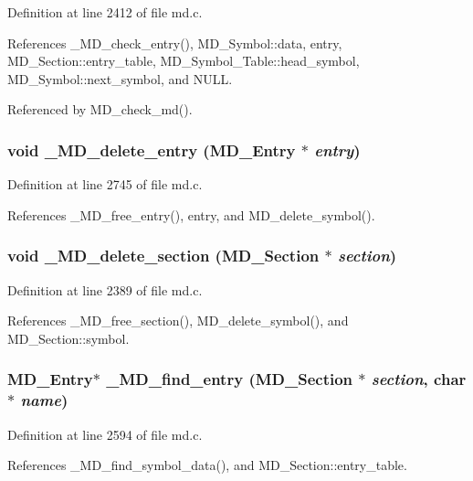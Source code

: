 Definition at line 2412 of file md.c.

References \_\-MD\_\-check\_\-entry(), MD\_\-Symbol::data, entry, MD\_\-Section::entry\_\-table, MD\_\-Symbol\_\-Table::head\_\-symbol, MD\_\-Symbol::next\_\-symbol, and NULL.

Referenced by MD\_\-check\_\-md().
\subsubsection{\setlength{\rightskip}{0pt plus 5cm}void \_\-MD\_\-delete\_\-entry (\bf{MD\_\-Entry} $\ast$ {\em entry})}\label{md_8c_0acfdbe44ed962417ea0fcbe76f5d1cb}




Definition at line 2745 of file md.c.

References \_\-MD\_\-free\_\-entry(), entry, and MD\_\-delete\_\-symbol().
\subsubsection{\setlength{\rightskip}{0pt plus 5cm}void \_\-MD\_\-delete\_\-section (\bf{MD\_\-Section} $\ast$ {\em section})}\label{md_8c_3db8411a7ee9c1f869c23accc535913d}




Definition at line 2389 of file md.c.

References \_\-MD\_\-free\_\-section(), MD\_\-delete\_\-symbol(), and MD\_\-Section::symbol.
\subsubsection{\setlength{\rightskip}{0pt plus 5cm}\bf{MD\_\-Entry}$\ast$ \_\-MD\_\-find\_\-entry (\bf{MD\_\-Section} $\ast$ {\em section}, char $\ast$ {\em name})}\label{md_8c_60d979ae5e7bf8577536835680cce03f}




Definition at line 2594 of file md.c.

References \_\-MD\_\-find\_\-symbol\_\-data(), and MD\_\-Section::entry\_\-table.
